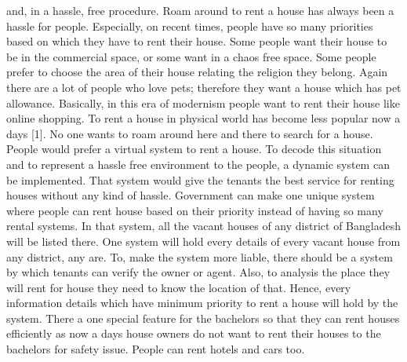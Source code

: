 \documentclass[12pt,a4paper]{report}
\begin{document}
{	and, in a hassle, free procedure. Roam around to rent a house has always been a hassle for people. Especially, on recent times, people have so many priorities based on which they have to rent their house. Some people want their house to be in the commercial space, or some want in a chaos free space. Some people prefer to choose the area of their house relating the religion they belong. Again there are a lot of people who love pets; therefore they want a house which has pet allowance. Basically, in this era of modernism people want to rent their house like online shopping. To rent a house in physical world has become less popular now a days [1]. No one wants to roam around here and there to search for a house. People would prefer a virtual system to rent a house. To decode this situation and to represent a hassle free environment to the people, a dynamic system can be implemented. That system would give the tenants the best service for renting houses without any kind of hassle. Government can make one unique system where people can rent house based on their priority instead of having so many rental systems. In that system, all the vacant houses of any district of Bangladesh will be listed there. One system will hold every details of every vacant house from any district, any are. To, make the system more liable, there should be a system by which tenants can verify the owner or agent. Also, to analysis the place they will rent for house they need to know the location of that. Hence, every information details which have minimum priority to rent a house will hold by the system. There a one special feature for the bachelors so that they can rent houses efficiently as now a days house owners do not want to rent their houses to the bachelors for safety issue. People can rent hotels and cars too.}
\end{document}

